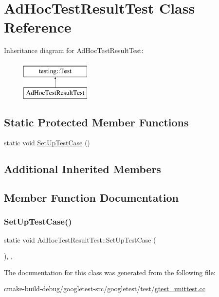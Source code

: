 \hypertarget{classAdHocTestResultTest}{}\section{Ad\+Hoc\+Test\+Result\+Test Class Reference}
\label{classAdHocTestResultTest}
Inheritance diagram for Ad\+Hoc\+Test\+Result\+Test\+:\begin{figure}[H]
\begin{center}
\leavevmode
\includegraphics[height=2.000000cm]{classAdHocTestResultTest}
\end{center}
\end{figure}
\subsection*{Static Protected Member Functions}
\begin{DoxyCompactItemize}
\item 
static void \mbox{\hyperlink{classAdHocTestResultTest_a0955d04d3dd7994561930c83489914a3}{Set\+Up\+Test\+Case}} ()
\end{DoxyCompactItemize}
\subsection*{Additional Inherited Members}


\subsection{Member Function Documentation}
\mbox{\label{classAdHocTestResultTest_a0955d04d3dd7994561930c83489914a3}} 
\subsubsection{\texorpdfstring{SetUpTestCase()}{SetUpTestCase()}}
{\footnotesize\ttfamily static void Ad\+Hoc\+Test\+Result\+Test\+::\+Set\+Up\+Test\+Case (\begin{DoxyParamCaption}{ }\end{DoxyParamCaption})\hspace{0.3cm}{\ttfamily [inline]}, {\ttfamily [static]}, {\ttfamily [protected]}}



The documentation for this class was generated from the following file\+:\begin{DoxyCompactItemize}
\item 
cmake-\/build-\/debug/googletest-\/src/googletest/test/\mbox{\hyperlink{gtest__unittest_8cc}{gtest\+\_\+unittest.\+cc}}\end{DoxyCompactItemize}
